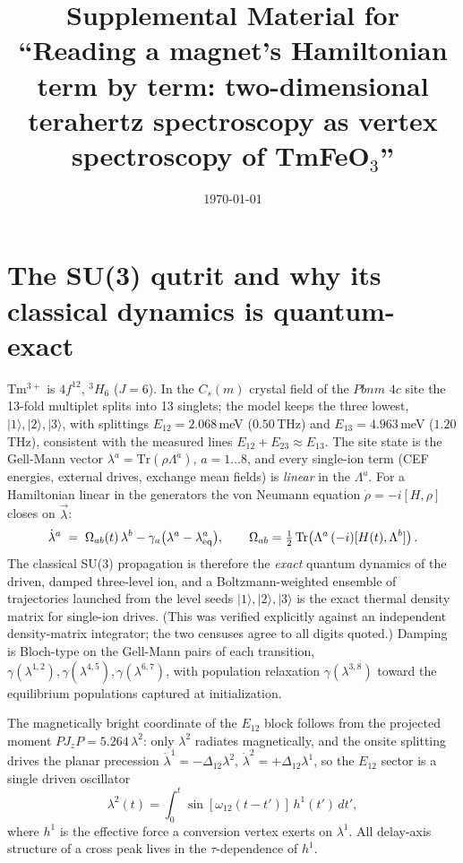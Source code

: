 \documentclass[11pt]{article}
\title{Supplemental Material for\\
``Reading a magnet's Hamiltonian term by term: two-dimensional terahertz
spectroscopy as vertex spectroscopy of TmFeO$_3$''}
\author{}
\date{\today}
\newcommand{\ket}[1]{|#1\rangle}
\begin{document}
\maketitle
\tableofcontents

\section{The SU(3) qutrit and why its classical dynamics is quantum-exact}
\label{si:qutrit}

Tm$^{3+}$ is $4f^{12}$, $^3H_6$ ($J=6$).  In the $C_s(m)$ crystal field of
the $Pbnm$ $4c$ site the 13-fold multiplet splits into 13 singlets; the
model keeps the three lowest, $\ket{1},\ket{2},\ket{3}$, with splittings
$E_{12}=2.068$\,meV ($0.50$\,THz) and $E_{13}=4.963$\,meV ($1.20$\,THz),
consistent with the measured lines $E_{12}+E_{23}\approx E_{13}$.  The
site state is the Gell-Mann vector $\lambda^a=\mathrm{Tr}(\rho\Lambda^a)$,
$a=1\dots8$, and every single-ion term (CEF energies, external drives,
exchange mean fields) is \emph{linear} in the $\Lambda^a$.  For a
Hamiltonian linear in the generators the von Neumann equation
$\dot\rho=-i[H,\rho]$ closes on $\vec\lambda$:
\begin{equation}
  \dot\lambda^a \;=\; \Omega_{ab}(t)\,\lambda^b
  -\gamma_a\big(\lambda^a-\lambda^a_{\rm eq}\big),\qquad
  \Omega_{ab}=\tfrac12\,\mathrm{Tr}\!\left(\Lambda^a\,
  (-i)[H(t),\Lambda^b]\right).
\end{equation}
The classical SU(3) propagation is therefore the \emph{exact} quantum
dynamics of the driven, damped three-level ion, and a Boltzmann-weighted
ensemble of trajectories launched from the level seeds
$\ket1,\ket2,\ket3$ is the exact thermal density matrix for single-ion
drives.  (This was verified explicitly against an independent
density-matrix integrator; the two censuses agree to all digits quoted.)
Damping is Bloch-type on the Gell-Mann pairs of each transition,
$\gamma(\lambda^{1,2}),\gamma(\lambda^{4,5}),\gamma(\lambda^{6,7})$, with
population relaxation $\gamma(\lambda^{3,8})$ toward the equilibrium
populations captured at initialization.

The magnetically bright coordinate of the $E_{12}$ block follows from the
projected moment $P J_z P=5.264\,\lambda^2$: only $\lambda^2$ radiates
magnetically, and the onsite splitting drives the planar precession
$\dot\lambda^1=-\Delta_{12}\lambda^2$,
$\dot\lambda^2=+\Delta_{12}\lambda^1$, so the $E_{12}$ sector is a single
driven oscillator
\begin{equation}
  \lambda^2(t)=\int_0^t \sin[\omega_{12}(t-t')]\,h^1(t')\,dt',
  \label{eq:si-osc}
\end{equation}
where $h^1$ is the effective force a conversion vertex exerts on
$\lambda^1$.  All delay-axis structure of a cross peak lives in the
$\tau$-dependence of $h^1$.
\end{document}
